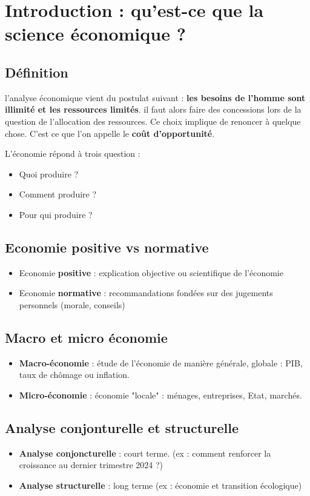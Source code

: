 \chapter{Introduction : qu'est-ce que la science économique ?}
\section{Définition}
l'analyse économique vient du postulat suivant : \textbf{les besoins de l'homme sont illimité et les ressources limités}. il faut alors faire des concessions lors de la question de l'allocation des ressources. Ce choix implique de renoncer à quelque chose. C'est ce que l'on appelle le \textbf{coût d'opportunité}. \newline

L'économie répond à trois question :
\begin{itemize}
    \item Quoi produire ?
    \item Comment produire ?
    \item Pour qui produire ?
\end{itemize}
\newpage
\section{Economie positive vs normative}
\begin{itemize}
    \item Economie \textbf{positive} : explication objective ou scientifique de l'économie
    \item Economie \textbf{normative} : recommandations fondées sur des jugements personnels (morale, conseils)
\end{itemize}

\section{Macro et micro économie}
\begin{itemize}
    \item \textbf{Macro-économie} : étude de l'économie de manière générale, globale : PIB, taux de chômage ou inflation.
    \item \textbf{Micro-économie} : économie "locale" : ménages, entreprises, Etat, marchés.
\end{itemize}
\section{Analyse conjonturelle et structurelle}
\begin{itemize}
    \item \textbf{Analyse conjoncturelle} : court terme. (ex : comment renforcer la croissance au dernier trimestre 2024 ?)
    \item \textbf{Analyse structurelle} : long terme (ex : économie et transition écologique)
\end{itemize}
